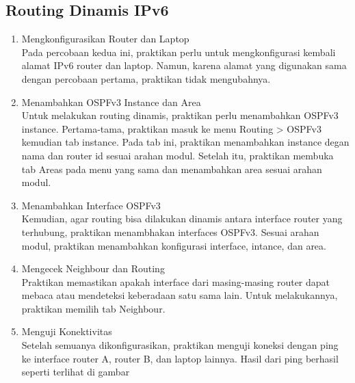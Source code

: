 \subsection{Routing Dinamis IPv6}
\begin{enumerate}
  \item Mengkonfigurasikan Router dan Laptop \\
  Pada percobaan kedua ini, praktikan perlu untuk mengkonfigurasi kembali alamat IPv6 router dan laptop. Namun, karena alamat yang digunakan sama dengan percobaan pertama, praktikan tidak mengubahnya.
  \item Menambahkan OSPFv3 Instance dan Area \\
  Untuk melakukan routing dinamis, praktikan perlu menambahkan OSPFv3 instance. Pertama-tama, praktikan masuk ke menu Routing > OSPFv3 kemudian tab instance. Pada tab ini, praktikan menambahkan instance degan nama dan router id sesuai arahan modul. Setelah itu, praktikan membuka tab Areas pada menu yang sama dan menambahkan area sesuai arahan modul. 
  \item Menambahkan Interface OSPFv3 \\
  Kemudian, agar routing bisa dilakukan dinamis antara interface router yang terhubung, praktikan menambhakan interfaces OSPFv3. Sesuai arahan modul, praktikan menambahkan konfigurasi interface, intance, dan area.
  \item Mengecek Neighbour dan Routing \\
  Praktikan memastikan apakah interface dari masing-masing router dapat mebaca atau mendeteksi keberadaan satu sama lain. Untuk melakukannya, praktikan memilih tab Neighbour.
  \item Menguji Konektivitas \\
  Setelah semuanya dikonfigurasikan, praktikan menguji koneksi dengan ping ke interface router A, router B, dan laptop lainnya. Hasil dari ping berhasil seperti terlihat di gambar
\end{enumerate}

